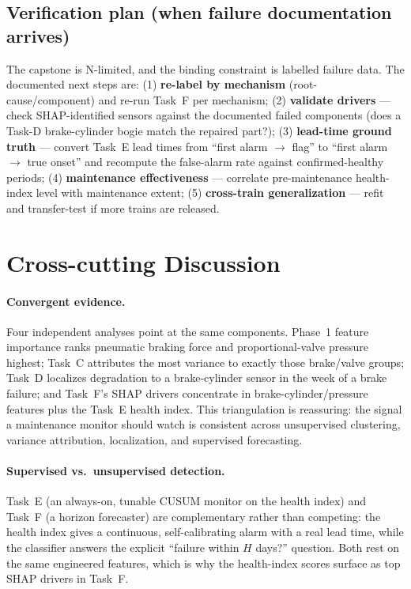 \documentclass[11pt,a4paper]{article}
\begin{document}
\subsection{Verification plan (when failure documentation arrives)}
The capstone is N-limited, and the binding constraint is labelled failure data. The
documented next steps are: (1) \textbf{re-label by mechanism} (root-cause/component) and
re-run Task~F per mechanism; (2) \textbf{validate drivers} --- check SHAP-identified sensors
against the documented failed components (does a Task-D brake-cylinder bogie match the
repaired part?); (3) \textbf{lead-time ground truth} --- convert Task~E lead times from
``first alarm $\rightarrow$ flag'' to ``first alarm $\rightarrow$ true onset'' and recompute
the false-alarm rate against confirmed-healthy periods; (4) \textbf{maintenance
effectiveness} --- correlate pre-maintenance health-index level with maintenance extent;
(5) \textbf{cross-train generalization} --- refit and transfer-test if more trains are
released.

\setcounter{section}{7}
\section{Cross-cutting Discussion}
\label{sec:discussion}

\paragraph{Convergent evidence.}
Four independent analyses point at the same components. Phase~1 feature importance ranks
pneumatic braking force and proportional-valve pressure highest; Task~C attributes the
most variance to exactly those brake/valve groups; Task~D localizes degradation to a
brake-cylinder sensor in the week of a brake failure; and Task~F's SHAP drivers
concentrate in brake-cylinder/pressure features plus the Task~E health index. This
triangulation is reassuring: the signal a maintenance monitor should watch is consistent
across unsupervised clustering, variance attribution, localization, and supervised
forecasting.

\paragraph{Supervised vs.\ unsupervised detection.}
Task~E (an always-on, tunable CUSUM monitor on the health index) and Task~F (a horizon
forecaster) are complementary rather than competing: the health index gives a continuous,
self-calibrating alarm with a real lead time, while the classifier answers the explicit
``failure within $H$ days?'' question. Both rest on the same engineered features, which is
why the health-index scores surface as top SHAP drivers in Task~F.
\end{document}
